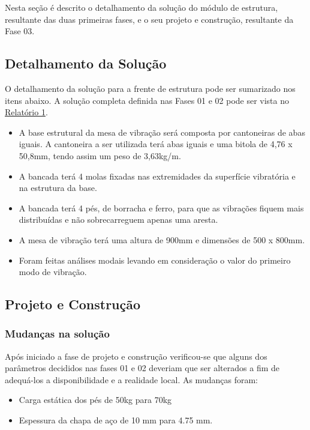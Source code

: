 \label{desenvolvimento_estrutura}
Nesta seção é descrito o detalhamento da solução do módulo de estrutura, resultante das duas primeiras fases,
e o seu projeto e construção, resultante da Fase 03.

\subsection{Detalhamento da Solução}

 O detalhamento da solução para a frente de estrutura pode ser sumarizado nos itens abaixo. A solução completa definida nas
  Fases 01 e 02 pode ser vista no \href{https://drive.google.com/file/d/0B5InkGKx6O-MR1B3eVYzZFpjQ3c/view?usp=sharing}{Relatório 1}.

 \begin{itemize}
  \item A base estrutural da mesa de vibração será composta por cantoneiras de abas iguais. A cantoneira a ser utilizada terá abas iguais e uma bitola de 4,76 x 50,8mm, tendo assim um peso de 3,63kg/m.
  \item A bancada terá 4 molas fixadas nas extremidades da superfície vibratória e na estrutura da base.
  \item A bancada terá 4 pés, de borracha e ferro, para que as vibrações fiquem mais distribuídas e não sobrecarreguem apenas uma aresta.
  \item A mesa de vibração terá uma altura de 900mm e dimensões de 500 x 800mm.
  \item Foram feitas análises modais levando em consideração o valor do primeiro modo de vibração.
\end{itemize}
\subsection{Projeto e Construção}

\subsubsection*{Mudanças na solução}

Após iniciado a fase de projeto e construção verificou-se que alguns dos parâmetros decididos nas fases 01 e 02 
deveriam que ser alterados a fim de adequá-los a disponibilidade e a realidade local. As mudanças foram:
\begin{itemize}
\item Carga estática dos pés de 50kg  para 70kg
\item Espessura da chapa de aço de 10 mm para 4.75 mm.

\end{itemize}

